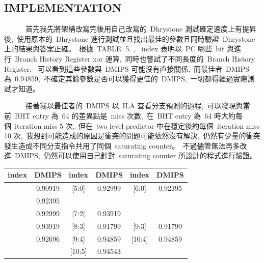 \documentclass{article}
\begin{document}
\begin{CJK*}{UTF8}{bsmi}
\begin{multicols}{2}
\begin{center}
    \section*{IMPLEMENTATION}
\end{center}

\begin{flushleft}
    \ \ \ \ \ \ 首先我先將架構改寫完後用自己改寫的\ Dhrystone 測試確定速度上有提昇後,\
    使用原本的\ Dhrystone 進行測試並且找出最佳的參數且同時驗證\ Dhrystone 上的結果與答案正確。\
    根據\ TABLE. 5. , \ index 表明以\ PC 哪些\ bit 與進行\ Branch History Register xor 運算,\
    同時也嘗試了不同長度的\ Branch History Register, \
    可以看到這些參數與\ DMIPS 可能沒有直接關係,\
    而最佳者\ DMIPS 為\ 0.94859,\
    不確定其餘參數是否可以獲得更佳的\ DMIPS,\
    一切都得經過實際測試才知道。\newline

    \ \ \ \ \ \ 接著我以最佳者的\ DMIPS 以\ ILA 查看分支預測的過程,\
    可以發現與當前\ BHT entry 為\ 64 的差異點是\ miss 次數,\
    在\ BHT entry 為\ 64 時大約每個\ iteration miss 5 次,\
    但在\ two level predictor 中在穩定後約每個\ iteration miss 10 次,\
    我想到可能造成的原因是衝突的問題可能依然沒有解決,\
    仍然有少量的衝突發生造成不同分支指令共用了同個\ saturating counter。\
    不過儘管無法再多改進\ DMIPS,\
    仍然可以使用自己針對\ saturating counter 所設計的程式進行驗證。

\end{flushleft}

\begin{center}
    \begin{tabular}{||c c c c c c ||} 
        \hline
        index & DMIPS & index & DMIPS & index & DMIPS \\ [1.0ex] 
        \hline\hline
        [4:0] & 0.90919 & [5:0] & 0.92999 & [6:0] &  0.92395  \\ 
        \hline
        [5:1] & 0.92395 &  &  &  &  \\ 
        \hline
        [6:2] & 0.92999 & [7:2] & 0.93919 &  &    \\
        \hline
        [7:3] & 0.93919 & [8:3] & 0.91799 & [9:3] & 0.91799  \\
        \hline
        [8:4] & 0.92696 & [9:4] & 0.94859 & [10:4] & 0.94859\\
        \hline
         &    &   [10:5] & 0.94543
    \end{tabular}
\end{center}


\end{multicols}
\end{CJK*}
\end{document}
